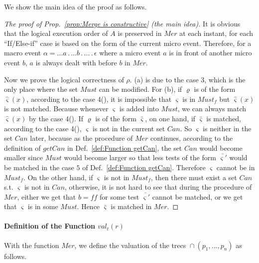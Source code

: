 \documentclass{fcs}
\newcommand{\rmn}[1]{(\romannumeral#1)}
\newcommand{\sig}[0]{\varsigma}
\newcommand{\false}[0]{\mathit{ff}}
\newcommand{\val}[0]{\mathit{val}}
\DeclareMathOperator{\para}{\cap}
\newcommand{\Must}[0]{\mathit{Must}}
\newcommand{\valt}[0]{\val_t}
\DeclareMathOperator{\nex}{.}
\newcommand{\Merge}[0]{\mathit{Mer}}
\newcommand{\Can}[0]{\mathit{Can}}
\newcommand{\getCan}[0]{\mathit{getCan}}
\begin{document}
We show the main idea of the proof as follows.
\begin{proof}[The proof of Prop.~\ref{prop:Merge is constructive} (the main idea)]
It is obvious that the logical execution order of $A$ is preserved in $\Merge$ at each instant, for each ``If/Else-if'' case is based on the form of the current micro event.
Therefore, for a macro event $\alpha = ...a\nex ...b\nex ...\nex\epsilon$ where a micro event $a$ is in front of another micro event $b$, $a$ is always dealt with before $b$ in $\Merge$.

Now we prove the logical correctness of $\rho$. (a) is due to the case 3, which is the only place where the set $\Must$ can be modified.
For (b),
if $\varrho$ is of the form $\hat{\sig}(x)$, according to the case 4\rmn{1}, it is impossible that $\sig$ is in $\Must_f$ but $\hat{\sig}(x)$ is not matched.
Because whenever $\sig$ is added into $\Must$, we can always match $\hat{\sig}(x)$ by the case 4\rmn{1}.
If $\varrho$ is of the form $\bar{\sig}$,
on one hand, if $\bar{\sig}$ is matched, according to the case 4\rmn{2}, $\sig$ is not in the current set $\Can$.
So $\sig$ is neither in the set $\Can$ later, because as the procedure of $\Merge$ continues,
according to the definition of $\getCan$ in Def.~\ref{def:Function getCan}, the set $\Can$ would become smaller since
$\Must$ would become larger so that less tests of the form $\bar{\sig'}$ would be matched in the case $5$ of Def.~\ref{def:Function getCan}.
Therefore $\sig$ cannot be in $\Must_f$.
On the other hand, if $\sig$ is not in $\Must_f$, then there must exist a set $\Can$ s.t. $\sig$ is not in $\Can$, otherwise, it is not hard to see that during the procedure of $\Merge$,
either we get that $b=\false$ for some test $\bar{\sig'}$ cannot be matched, or we get that $\sig$ is in some $\Must$.
Hence $\bar{\sig}$ is matched in $\Merge$.
\end{proof}


\paragraph{Definition of the Function $\valt(r)$}

With the function $\Merge$, we define the valuation of the trecs $\para(p_1,...,p_n)$ as follows.
\end{document}

